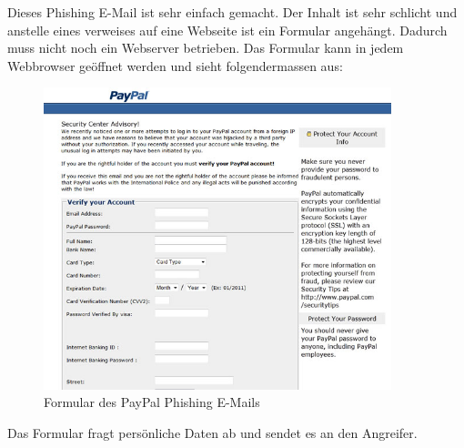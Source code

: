 Dieses Phishing E-Mail ist sehr einfach gemacht. Der Inhalt ist sehr schlicht und anstelle eines verweises auf eine Webseite ist ein Formular angehängt. Dadurch muss nicht noch ein Webserver betrieben. Das Formular kann in jedem Webbrowser geöffnet werden und sieht folgendermassen aus:

\begin{figure}[H]
  \centering
  \includegraphics[width=0.9\textwidth]{images/phishing-beispiel-paypal2.jpg}
  \caption{Formular des PayPal Phishing E-Mails}
  \label{fig:phishing:beispiele:paypaleinfachformular}
\end{figure}

Das Formular fragt persönliche Daten ab und sendet es an den Angreifer.

